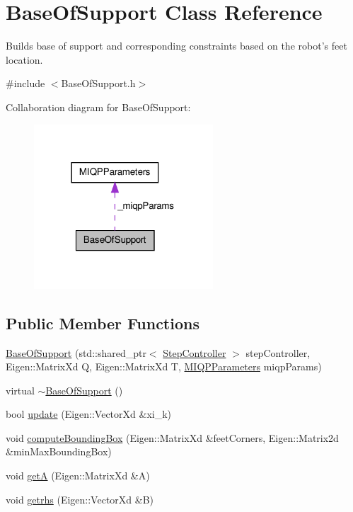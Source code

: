 \hypertarget{classBaseOfSupport}{\section{\-Base\-Of\-Support \-Class \-Reference}
\label{classBaseOfSupport}
}


\-Builds base of support and corresponding constraints based on the robot's feet location.  




{\ttfamily \#include $<$\-Base\-Of\-Support.\-h$>$}



\-Collaboration diagram for \-Base\-Of\-Support\-:
\nopagebreak
\begin{figure}[H]
\begin{center}
\leavevmode
\includegraphics[width=190pt]{classBaseOfSupport__coll__graph}
\end{center}
\end{figure}
\subsection*{\-Public \-Member \-Functions}
\begin{DoxyCompactItemize}
\item 
\hyperlink{classBaseOfSupport_a151ca13d50f730d0cdf2368bffd4ee72}{\-Base\-Of\-Support} (std\-::shared\-\_\-ptr$<$ \hyperlink{classStepController}{\-Step\-Controller} $>$ step\-Controller, \-Eigen\-::\-Matrix\-Xd \-Q, \-Eigen\-::\-Matrix\-Xd \-T, \hyperlink{structMIQPParameters}{\-M\-I\-Q\-P\-Parameters} miqp\-Params)
\item 
virtual \hyperlink{classBaseOfSupport_a8f2261d4d25cd677d0114df426dfbfa7}{$\sim$\-Base\-Of\-Support} ()
\item 
bool \hyperlink{classBaseOfSupport_a9301442842af0ea76629227c26074c86}{update} (\-Eigen\-::\-Vector\-Xd \&xi\-\_\-k)
\item 
void \hyperlink{classBaseOfSupport_a7bfb9f5992767e2c3c3577d96eb47df9}{compute\-Bounding\-Box} (\-Eigen\-::\-Matrix\-Xd \&feet\-Corners, \-Eigen\-::\-Matrix2d \&min\-Max\-Bounding\-Box)
\item 
void \hyperlink{classBaseOfSupport_aea8a83e44da4acb1fdbf47cf0e3484d8}{get\-A} (\-Eigen\-::\-Matrix\-Xd \&\-A)
\item 
void \hyperlink{classBaseOfSupport_a4704ca8a8e7058cc1ba8241d084625bb}{getrhs} (\-Eigen\-::\-Vector\-Xd \&\-B)
\end{DoxyCompactItemize}
